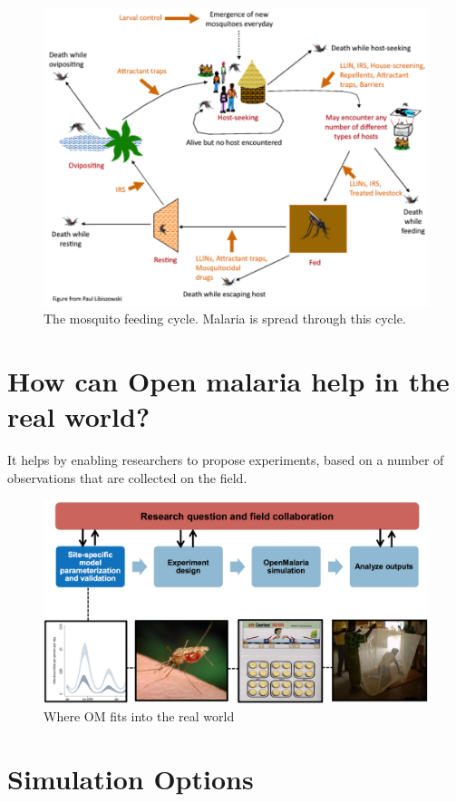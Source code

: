 \documentclass[]{scrartcl}
\begin{document}
\begin{figure}[ht!]
\includegraphics[width=\textwidth]{images/malariacycle.png}
\caption{The mosquito feeding cycle. Malaria is spread through this cycle.}
\end{figure}

\section{How can Open malaria help in the real world?}

It helps by enabling researchers to propose experiments, based on a number of observations that are collected on the field. 

\begin{figure}[h!]
\includegraphics[width=\textwidth]{images/research_process.png}
\caption{Where OM fits into the real world}
\end{figure}
\section{Simulation Options}
\end{document}
